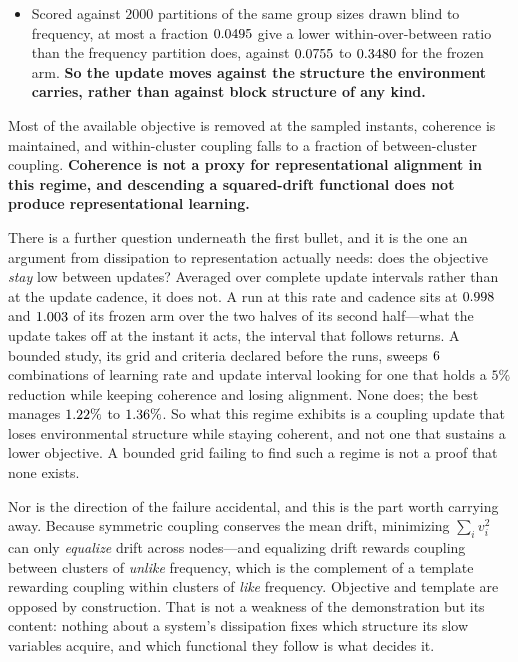 \documentclass[11pt]{article}
\begin{document}
\begin{itemize}[leftmargin=*,noitemsep]
unity. Against $2000$
node relabellings the final kernel is further from the true template than from a
fraction $\plasticityPercentileMin$ to $\plasticityPercentileMax$ of them,
where the permuted arm reaches $\plasticityPermutedPercentileMin$ to
$\plasticityPermutedPercentileMax$.
\item Scored against $2000$ partitions of the same group sizes drawn blind to
frequency, at most a fraction $0.0495$ give a lower
within-over-between ratio than the frequency partition does, against
$0.0755$ to $0.3480$
for the frozen arm. \textbf{So the update moves against the structure the
environment carries, rather than against block structure of any kind.}
\end{itemize}

\noindent
Most of the available objective is removed at the sampled instants, coherence
is maintained, and within-cluster coupling falls to a fraction of
between-cluster coupling. \textbf{Coherence is not a proxy for representational
alignment in this regime, and descending a squared-drift functional does not
produce representational learning.}

There is a further question underneath the first bullet, and it is the one an
argument from dissipation to representation actually needs: does the objective
\emph{stay} low between updates? Averaged over complete update intervals rather
than at the update cadence, it does not. A run at this rate and cadence sits at
$0.998$ and $1.003$ of
its frozen arm over the two halves of its second half---what the update takes
off at the instant it acts, the interval that follows returns. A bounded study, its grid and criteria declared
before the runs, sweeps $6$ combinations of learning
rate and update interval looking for one that holds a $5\%$ reduction while
keeping coherence and losing alignment. None does; the best manages
$1.22\%$ to $1.36\%$. So
what this regime exhibits is a coupling update that loses environmental
structure while staying coherent, and not one that sustains a lower objective.
A bounded grid failing to find such a regime is not a proof that none exists.

Nor is the direction of the failure accidental, and this is the part worth
carrying away. Because symmetric coupling conserves the mean drift, minimizing
$\sum_i v_i^2$ can only \emph{equalize} drift across nodes---and equalizing
drift rewards coupling between clusters of \emph{unlike} frequency, which is
the complement of a template rewarding coupling within clusters of \emph{like}
frequency. Objective and template are opposed by construction. That is not a
weakness of the demonstration but its content: nothing about a system's
dissipation fixes which structure its slow variables acquire, and which
functional they follow is what decides it.
\end{document}
